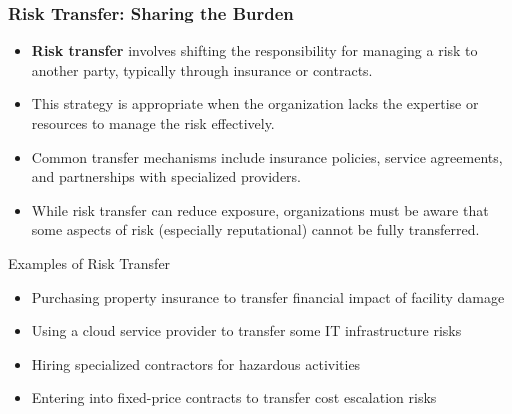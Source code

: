 \documentclass{beamer}
\begin{document}
          \begin{frame}
          \frametitle{Risk Transfer: Sharing the Burden}
          \begin{itemize}
            \item \textbf{Risk transfer} involves shifting the responsibility for managing a risk to another party, typically through insurance or contracts.
            \item This strategy is appropriate when the organization lacks the expertise or resources to manage the risk effectively.
            \item Common transfer mechanisms include insurance policies, service agreements, and partnerships with specialized providers.
            \item While risk transfer can reduce exposure, organizations must be aware that some aspects of risk (especially reputational) cannot be fully transferred.
          \end{itemize}
          
          \begin{exampleblock}{Examples of Risk Transfer}
          \begin{itemize}
            \item Purchasing property insurance to transfer financial impact of facility damage
            \item Using a cloud service provider to transfer some IT infrastructure risks
            \item Hiring specialized contractors for hazardous activities
            \item Entering into fixed-price contracts to transfer cost escalation risks
          \end{itemize}
          \end{exampleblock}
          \end{frame}
          
\end{document}
